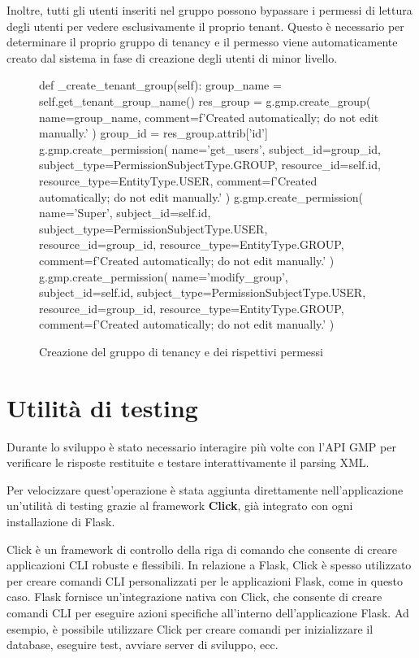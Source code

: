 Inoltre, tutti gli utenti inseriti nel gruppo possono bypassare i permessi di lettura degli utenti per vedere esclusivamente il proprio tenant. Questo è necessario per determinare il proprio gruppo di tenancy e il permesso viene automaticamente creato dal sistema in fase di creazione degli utenti di minor livello.

\begin{figure}
\begin{pycode}
def _create_tenant_group(self):
    group_name = self.get_tenant_group_name()
    res_group = g.gmp.create_group(
        name=group_name,
        comment=f'Created automatically; do not edit manually.'
    )
    group_id = res_group.attrib['id']
    g.gmp.create_permission(
        name='get_users',
        subject_id=group_id,
        subject_type=PermissionSubjectType.GROUP,
        resource_id=self.id,
        resource_type=EntityType.USER,
        comment=f'Created automatically; do not edit manually.'
    )
    g.gmp.create_permission(
        name='Super',
        subject_id=self.id,
        subject_type=PermissionSubjectType.USER,
        resource_id=group_id,
        resource_type=EntityType.GROUP,
        comment=f'Created automatically; do not edit manually.'
    )
    g.gmp.create_permission(
        name='modify_group',
        subject_id=self.id,
        subject_type=PermissionSubjectType.USER,
        resource_id=group_id,
        resource_type=EntityType.GROUP,
        comment=f'Created automatically; do not edit manually.'
    )
\end{pycode}
\caption{Creazione del gruppo di tenancy e dei rispettivi permessi}
\end{figure}

\section{Utilità di testing}
Durante lo sviluppo è stato necessario interagire più volte con l'API GMP per verificare le risposte restituite e testare interattivamente il parsing XML.

Per velocizzare quest'operazione è stata aggiunta direttamente nell'applicazione  un'utilità di testing grazie al framework \textbf{Click}, già integrato con ogni installazione di Flask.

Click è un framework di controllo della riga di comando che consente di creare applicazioni CLI robuste e flessibili. In relazione a Flask, Click è spesso utilizzato per creare comandi CLI personalizzati per le applicazioni Flask, come in questo caso.
Flask fornisce un'integrazione nativa con Click, che consente di creare comandi CLI per eseguire azioni specifiche all'interno dell'applicazione Flask. Ad esempio, è possibile utilizzare Click per creare comandi per inizializzare il database, eseguire test, avviare server di sviluppo, ecc.

